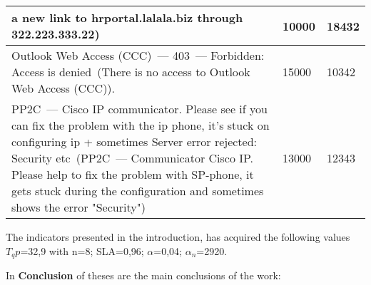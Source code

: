 \begin{longtable}{|p{12cm}|p{2cm}|p{2cm}|}
a new link to hrportal.lalala.biz through 322.223.333.22)    & 10000 & 18432  \\ 
  \hline
  Outlook Web Access (CCC)~--- 403~--- Forbidden: Access is denied~(There is no access to Outlook Web Access (CCC)). & 15000 & 10342\\ 
  \hline
  PP2C~--- Cisco IP communicator. Please see if you can fix the problem with the ip phone, it's stuck on configuring ip + sometimes Server error rejected: Security etc~(PP2C~--- Communicator Cisco IP. Please help to fix the problem with SP-phone, it gets stuck during the configuration and sometimes shows the error "Security")  & 13000 & 12343 \\ 
   
  \end{longtable}
  The indicators presented in the introduction, has acquired the following values $T_qp$=32,9 with n=8; SLA=0,96; $\alpha$=0,04;  $\alpha_n$=2920. 

In \textbf{Conclusion} of theses are the main conclusions of the work:


 

\renewcommand{\refname}{\large Author's publications on dissertation topic}

\insertbiblioalleng

